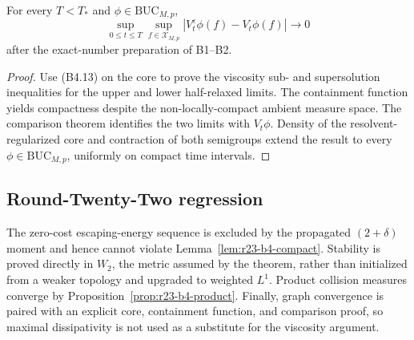 \begin{theorem}
\label{thm:r23-b4-limit}
For every $T< T_*$ and $\phi\in\mathrm{BUC}_{M,p}$,
\[
 \sup_{0\le t\le T}\sup_{f\in\mathcal X_{M,p}}
 |V_t^\varepsilon\phi(f)-V_t\phi(f)|\longrightarrow0     \tag{B4.14}
\]
after the exact-number preparation of B1--B2.
\end{theorem}

\begin{proof}
Use (B4.13) on the core to prove the viscosity sub- and supersolution
inequalities for the upper and lower half-relaxed limits.  The containment
function yields compactness despite the non-locally-compact ambient measure
space.  The comparison theorem identifies the two limits with $V_t\phi$.
Density of the resolvent-regularized core and contraction of both semigroups
extend the result to every $\phi\in\mathrm{BUC}_{M,p}$, uniformly on compact
time intervals.
\end{proof}

\subsection{Round-Twenty-Two regression}

The zero-cost escaping-energy sequence is excluded by the propagated
$(2+\delta)$ moment and hence cannot violate
Lemma~\ref{lem:r23-b4-compact}.  Stability is proved directly in $W_2$, the
metric assumed by the theorem, rather than initialized from a weaker topology
and upgraded to weighted $L^1$.  Product collision measures converge by
Proposition~\ref{prop:r23-b4-product}.  Finally, graph convergence is paired
with an explicit core, containment function, and comparison proof, so maximal
dissipativity is not used as a substitute for the viscosity argument.
